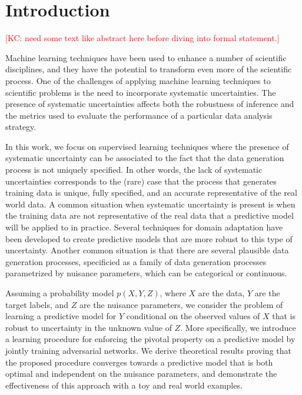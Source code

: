\documentclass[twocolumn,superscriptaddress,aps]{revtex4-1}
\newcommand{\kcnote}[1]{\textcolor{red}{[KC: #1]}}
\theoremstyle{plain}
\begin{document}
\maketitle

\section{Introduction}

\kcnote{ need some text like abstract here before diving into formal statement.}


Machine learning techniques have been used to enhance a number of scientific
disciplines, and they have the potential to transform even more of the
scientific process. One of the challenges of applying machine learning
techniques to scientific problems is the need to incorporate systematic
uncertainties. The presence of systematic uncertainties affects both the
robustness of inference and the metrics used to evaluate the performance of a
particular data analysis strategy.

In this work, we focus on supervised learning techniques where the presence of
systematic uncertainty can be associated to the fact that the data generation
process is not uniquely specified. In other words, the lack of systematic
uncertainties corresponds to the (rare) case that the process that generates
training data is unique, fully specified, and an accurate representative of the
real world data.
A common situation when systematic uncertainty is present is when the training
data are not representative of the real data that a predictive model will be
applied to in practice. Several techniques for domain adaptation have been
developed to create predictive models that are more robust to this type of
uncertainty.
Another common situation is that there are several plausible data generation
processes, specificied as a family of data generation processes
parametrized by nuisance parameters, which can be categorical or continuous.

Assuming a probability model $p(X,Y,Z)$, where $X$ are the
data, $Y$ are the target labels, and $Z$ are the nuisance parameters,
we consider the problem of learning a predictive model for $Y$ conditional on the
observed values of $X$ that is robust to uncertainty in the unknown value of
$Z$. More specifically, we introduce a learning procedure for enforcing the
pivotal property on a predictive model by jointly training adversarial networks.
We derive theoretical results proving that the proposed procedure converges
towards a predictive model that is both optimal and independent on the nuisance
parameters, and demonstrate the effectiveness of this approach with a toy and
real world examples.
\end{document}
